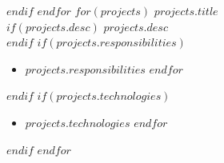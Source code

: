 \documentclass[a4paper,10pt]{article}
\begin{document}
    $endif$
    \vspace{0.2cm}
$endfor$
$for(projects)$
    \textbf{$projects.title$} \\
    $if(projects.desc)$ $projects.desc$ \\ $endif$
    $if(projects.responsibilities)$
     \\
    \begin{itemize}
        $for(projects.responsibilities)$
        \item $projects.responsibilities$
        $endfor$
    \end{itemize}
    $endif$
    $if(projects.technologies)$
     \\
    \begin{itemize}
        $for(projects.technologies)$
        \item $projects.technologies$
        $endfor$
    \end{itemize}
    $endif$
    \vspace{0.2cm}
$endfor$
\end{document}
